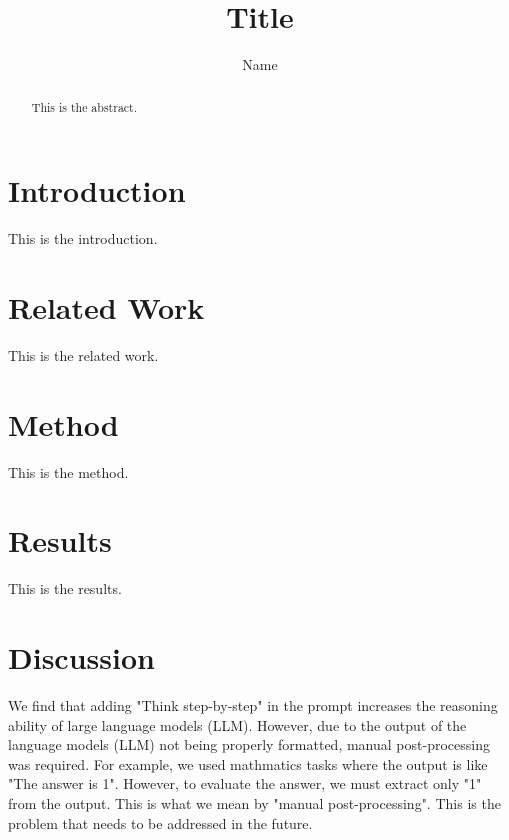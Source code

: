 \documentclass{article}
\title{Title}
\author{Name}
\begin{document}
\maketitle

\begin{abstract}
This is the abstract.
\end{abstract}

\section{Introduction}
This is the introduction.

\section{Related Work}
This is the related work.

\section{Method}
This is the method.

\section{Results}
This is the results.

\section{Discussion}
We find that adding "Think step-by-step" in the prompt increases the reasoning ability of large language models (LLM).
However, due to the output of the language models (LLM) not being properly formatted, manual post-processing was required. 
For example, we used mathmatics tasks where the output is like "The answer is 1". However, to evaluate the answer, we must extract only "1" from the output.
This is what we mean by "manual post-processing". This is the problem that needs to be addressed in the future.
\end{document}
